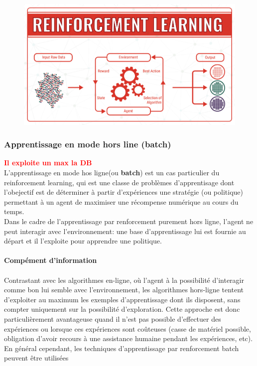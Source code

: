 \begin{figure}[H]
    \centering
    \includegraphics[scale = 0.25]{Question1/reinforcement-learning.png}
    \caption{}
    \label{fig:my_label}
\end{figure}
\subsubsection{Apprentissage en mode hors line (batch)}
\textcolor{red}{\textbf{Il exploite un max la DB}}\\
L'apprentissage en mode hos ligne(ou \textbf{batch}) est un cas particulier du reinforcement learning, qui est une classe de problèmes d'apprentisage dont l'obejectif est de déterminer à partir d'expériences une stratégie (ou politique) permettant à un agent de maximiser une récompense numérique au cours du temps.\\
Dans le cadre de l'apprentissage par renforcement purement hors ligne, l'agent ne peut interagir avec l'environnement: une base d'apprentissage lui est fournie au départ et il l'exploite pour apprendre une politique.\\\\
\textbf{Compément d'information}\\\\
Contrastant avec les algorithmes en-ligne, où l'agent à la possibilité d'interagir comme bon lui semble avec l'environnement, les algorithmes hors-ligne tentent d'exploiter au maximum les exemples d'apprentissage dont ils disposent, sans compter uniquement sur la possibilité d'exploration. Cette approche est donc particulièrement avantageuse quand il n'est pas possible d'effectuer des expériences ou lorsque ces expériences sont coûteuses (casse de matériel possible, obligation d'avoir recours à une assistance humaine pendant les expériences, etc). En général cependant, les techniques d'apprentissage par renforcement batch peuvent être utilisées

